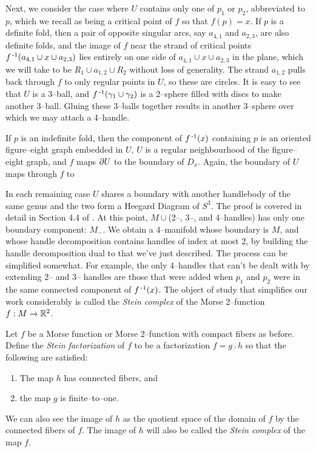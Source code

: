 Next, we consider the case where $U$ contains only one of $p_1$ or $p_2$, abbreviated to $p$, which we recall as being a critical point of $f$ so that $f(p)=x$.
If $p$ is a definite fold, then a pair of opposite singular arcs, say $a_{4,1}$ and $a_{2,3}$, are also definite folds, and the image of $f$ near the strand of critical points $f^{\,\text{-}1} (a_{4,1}\cup x \cup a_{2,3})$ lies entirely on one side of $a_{4,1}\cup x \cup a_{2,3}$ in the plane, which we will take to be $R_1\cup a_{1,2}\cup R_2$ without loss of generality.
The strand $a_{1,2}$ pulls back through $f$ to only regular points in $U$, so these are circles.
It is easy to see that $U$ is a 3--ball, and $f^{\,\text{-}1} (\gamma_1\cup\gamma_2)$ is a 2--sphere filled with discs to make another 3--ball.
Gluing these 3--balls together results in another 3--sphere over which we may attach a 4--handle.

If $p$ is an indefinite fold, then the component of $f^{\,\text{-}1} (x)$ containing $p$ is an oriented figure--eight graph embedded in $U$, $U$ is a regular neighbourhood of the figure--eight graph, and $f$ maps $\partial U$ to the boundary of $D_x$.
Again, the boundary of $U$ maps through $f$ to 

In each remaining case $U$ shares a boundary with another handlebody of the same genus and the two form a Heegard Diagram of $S^3$.
The proof is covered in detail in Section 4.4 of \cite{CostThur08}.
At this point, $M\cup$(2--, 3--, and 4--handles) has only one boundary component: $M_-$.
We obtain a 4--manifold whose boundary is $M$, and whose handle decomposition contains handles of index at most 2, by building the handle decomposition dual to that we've just described.
The process can be simplified somewhat.
For example, the only 4--handles that can't be dealt with by extending 2-- and 3-- handles are those that were added when $p_1$ and $p_2$ were in the same connected component of $f^{\,\text{-}1} (x)$.
The object of study that simplifies our work considerably is called the \emph{Stein complex} of the Morse 2--function $f:M\to\mathbb{R}^2$.

Let $f$ be a Morse function or Morse 2--function with compact fibers as before.
Define the \emph{Stein factorization} of $f$ to be a factorization $f=g\comp h$ so that the following are satisfied:
\begin{enumerate}
  \item The map $h$ has connected fibers, and
  \item the map $g$ is finite--to--one.
\end{enumerate}
We can also see the image of $h$ as the quotient space of the domain of $f$ by the connected fibers of $f$.
The image of $h$ will also be called the \emph{Stein complex} of the map $f$.


